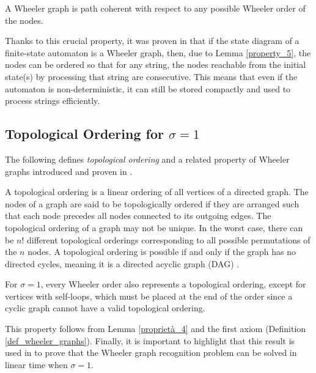 \begin{lemma} \label{property_5}
    A Wheeler graph is path coherent with respect to any possible Wheeler order of the nodes.
\end{lemma}

Thanks to this crucial property, it was proven in \cite{1} that if the state diagram of a finite-state automaton is a Wheeler graph, then, due to Lemma \ref{property_5}, the nodes can be ordered so that for any string, the nodes reachable from the initial state(s) by processing that string are consecutive. This means that even if the automaton is non-deterministic, it can still be stored compactly and used to process strings efficiently.

\subsection{Topological Ordering for \texorpdfstring{$\sigma=1$}{Lg}}
The following defines \textit{topological ordering} and a related property of Wheeler graphs introduced and proven in \cite{15}.

\begin{definition}
    A topological ordering is a linear ordering of all vertices of a directed graph. The nodes of a graph are said to be topologically ordered if they are arranged such that each node precedes all nodes connected to its outgoing edges. The topological ordering of a graph may not be unique. In the worst case, there can be $n!$ different topological orderings corresponding to all possible permutations of the $n$ nodes. A topological ordering is possible if and only if the graph has no directed cycles, meaning it is a directed acyclic graph (DAG) \cite{16}.
\end{definition}

\begin{lemma} \label{property_6}
    For $\sigma=1$, every Wheeler order also represents a topological ordering, except for vertices with self-loops, which must be placed at the end of the order since a cyclic graph cannot have a valid topological ordering.
\end{lemma}

This property follows from Lemma \ref{proprietà_4} and the first axiom (Definition \ref{def_wheeler_graphs}). Finally, it is important to highlight that this result is used in \cite{15} to prove that the Wheeler graph recognition problem can be solved in linear time when $\sigma=1$.

\begingroup
\sloppy
\raggedright
